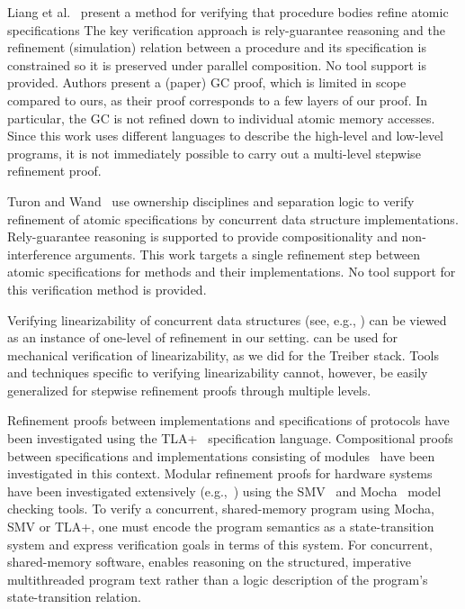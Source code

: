Liang et al.~\cite{LiangRGSim} present a method for verifying that procedure
bodies refine atomic specifications
The key verification approach is
rely-guarantee reasoning and the refinement (simulation) relation between
a procedure and its specification is constrained so it is preserved under
parallel composition. 
No tool support is provided. 
Authors present a (paper) GC proof, which is limited in scope compared
to ours, as their proof corresponds to a few layers of our proof. In particular,
the GC is not refined down to individual atomic memory accesses. 
Since this work uses different languages to describe the high-level
and low-level programs, it is not immediately possible to carry out a
multi-level stepwise refinement proof. 

Turon and Wand~\cite{TuronM11} use ownership disciplines and
separation logic to verify refinement of atomic specifications by 
concurrent data structure implementations. 
Rely-guarantee reasoning is
supported to provide compositionality and non-interference
arguments. 
This work targets a single refinement step between atomic
specifications for methods and their implementations. 
No tool support for this verification method is provided. 

Verifying linearizability of concurrent data structures (see, e.g.,
\cite{tacasLin,aliLin}) can be viewed as an instance of one-level of
refinement in our setting. 
\civl can be used for mechanical
verification of linearizability, as we did for the Treiber stack. 
Tools and techniques specific to verifying linearizability
cannot, however, be easily generalized for stepwise refinement proofs
through multiple levels. 

Refinement proofs
between implementations and specifications of protocols have been
investigated using the TLA+~\cite{Lamport2004} specification
language. 
Compositional proofs between specifications and
implementations consisting of modules~\cite{AbadiAssumeGuarantee} have
been investigated in this context. 
Modular refinement proofs for hardware systems have been investigated extensively
(e.g.,~\cite{Henzinger1999,Eiriksson2000}) using the SMV~\cite{McMillan00} and Mocha~\cite{AlurHMQRT98} 
model checking tools.
To verify a concurrent, shared-memory program using Mocha, SMV or
TLA+, one must encode
the program semantics as a state-transition system and express
verification goals in terms of this system. 
For concurrent, shared-memory
software, \civl enables reasoning on the structured, imperative
multithreaded program text rather than a logic description of the
program's state-transition relation. 
 

